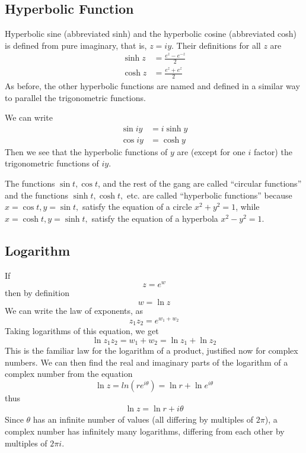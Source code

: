 \documentclass[../main.tex]{subfiles}
\begin{document}
\subsection*{Hyperbolic Function}

Hyperbolic sine (abbreviated sinh) and the hyperbolic cosine (abbreviated cosh) is defined from pure imaginary, that is, $ z = iy$. Their deﬁnitions for all $z$ are
\begin{align*}
    \sinh z&=\frac{e^{z}-e^{-z}}{2}\\
    \cosh z&=\frac{e^{z}+e^{z}}{2}
\end{align*}
As before, the other hyperbolic functions are named and deﬁned in a similar way to parallel the trigonometric functions. 

We can write 
\begin{align*}
    \sin iy &= i \sinh y\\
    \cos iy&=\cosh y
\end{align*}
Then we see that the hyperbolic functions of $y$ are (except for one $i$ factor) the trigonometric functions of $iy$.

The functions $\sin t, \cos t$, and the rest of the gang are called “circular functions” and the functions $\sinh t, \cosh t,$ etc. are called “hyperbolic functions” because $ x = \cos t, y = \sin t,$ satisfy the equation of a circle $x^2 + y^2 = 1$, while $x = \cosh t,  y = \sinh t,$ satisfy the equation of a hyperbola $x^2 - y^2 = 1$.

\subsection*{Logarithm}
If 
\begin{equation*}
    z=e^w
\end{equation*}
then by deﬁnition
\begin{equation*}
    w=\ln z
\end{equation*}
We can write the law of exponents, as
\begin{equation*}
    z_1z_2 = e^{w_1+w_2}
\end{equation*}
Taking logarithms of this equation, we get
\begin{equation*}
   \ln z_1z_2 = {w_1+w_2}=\ln z_1+\ln z_2
\end{equation*}
This is the familiar law for the logarithm of a product, justiﬁed now for complex numbers. We can then ﬁnd the real and imaginary parts of the logarithm of a complex number from the equation
\begin{equation*}
    \ln z = ln(re^{i\theta})=\ln r+\ln e^{i\theta}
\end{equation*}
thus
\begin{align*}
    \ln z = \ln r + i\theta
\end{align*}
Since $\theta$ has an inﬁnite number of values (all diﬀering by multiples of $2\pi$), a complex number has inﬁnitely many logarithms, diﬀering from each other by multiples of $2\pi i$.
\end{document}
